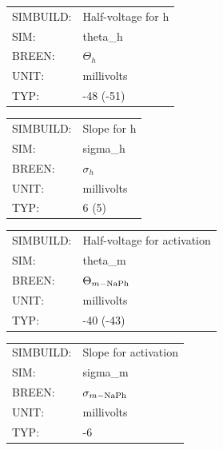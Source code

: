 \documentclass[12pt,openany,oneside]{book}
\begin{document}
\begin{flushleft}
\begin{tabular}{@{}ll@{}}
SIMBUILD: & Half-voltage for h\\
SIM: & theta\_h\\
BREEN: & $\Theta_h$\\
UNIT: & millivolts\\
TYP: & -48 (-51)\\
\end{tabular}
\end{flushleft}
\filbreak
\vspace{\baselineskip}

\begin{flushleft}
\begin{tabular}{@{}ll@{}}
SIMBUILD: & Slope for h\\
SIM: & sigma\_h\\
BREEN: & $\sigma_h$\\
UNIT: & millivolts\\
TYP: & 6 (5)\\
\end{tabular}
\end{flushleft}
\filbreak
\vspace{\baselineskip}

\begin{flushleft}
\begin{tabular}{@{}ll@{}}
SIMBUILD: & Half-voltage for activation\\
SIM: & theta\_m\\
BREEN: & $\Theta_{m-\rm NaPh}$\\
UNIT: & millivolts\\
TYP: & -40 (-43)\\
\end{tabular}
\end{flushleft}
\filbreak
\vspace{\baselineskip}

\begin{flushleft}
\begin{tabular}{@{}ll@{}}
SIMBUILD: & Slope for activation\\
SIM: & sigma\_m\\
BREEN: & $\sigma_{m-\rm NaPh}$\\
UNIT: & millivolts\\
TYP: & -6\\
\end{tabular}
\end{flushleft}
\filbreak
\vspace{\baselineskip}
\end{document}
